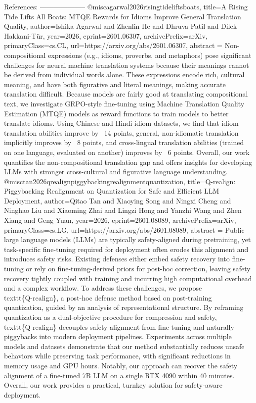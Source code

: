         References:
        --------------------
        @misc{agarwal2026risingtideliftsboats,
      title={A Rising Tide Lifts All Boats: MTQE Rewards for Idioms Improve General Translation Quality}, 
      author={Ishika Agarwal and Zhenlin He and Dhruva Patil and Dilek Hakkani-Tür},
      year={2026},
      eprint={2601.06307},
      archivePrefix={arXiv},
      primaryClass={cs.CL},
      url={https://arxiv.org/abs/2601.06307},
      abstract = {Non-compositional expressions (e.g., idioms, proverbs, and metaphors) pose significant challenges for neural machine translation systems because their meanings cannot be derived from individual words alone. These expressions encode rich, cultural meaning, and have both figurative and literal meanings, making accurate translation difficult. Because models are fairly good at translating compositional text, we investigate GRPO-style fine-tuning using Machine Translation Quality Estimation (MTQE) models as reward functions to train models to better translate idioms. Using Chinese and Hindi idiom datasets, we find that idiom translation abilities improve by ~14 points, general, non-idiomatic translation implicitly improves by ~8 points, and cross-lingual translation abilities (trained on one language, evaluated on another) improves by ~6 points. Overall, our work quantifies the non-compositional translation gap and offers insights for developing LLMs with stronger cross-cultural and figurative language understanding.}
}@misc{tan2026qrealignpiggybackingrealignmentquantization,
      title={Q-realign: Piggybacking Realignment on Quantization for Safe and Efficient LLM Deployment}, 
      author={Qitao Tan and Xiaoying Song and Ningxi Cheng and Ninghao Liu and Xiaoming Zhai and Lingzi Hong and Yanzhi Wang and Zhen Xiang and Geng Yuan},
      year={2026},
      eprint={2601.08089},
      archivePrefix={arXiv},
      primaryClass={cs.LG},
      url={https://arxiv.org/abs/2601.08089},
      abstract = {Public large language models (LLMs) are typically safety-aligned during pretraining, yet task-specific fine-tuning required for deployment often erodes this alignment and introduces safety risks. Existing defenses either embed safety recovery into fine-tuning or rely on fine-tuning-derived priors for post-hoc correction, leaving safety recovery tightly coupled with training and incurring high computational overhead and a complex workflow. To address these challenges, we propose \\texttt\{Q-realign\}, a post-hoc defense method based on post-training quantization, guided by an analysis of representational structure. By reframing quantization as a dual-objective procedure for compression and safety, \\texttt\{Q-realign\} decouples safety alignment from fine-tuning and naturally piggybacks into modern deployment pipelines. Experiments across multiple models and datasets demonstrate that our method substantially reduces unsafe behaviors while preserving task performance, with significant reductions in memory usage and GPU hours. Notably, our approach can recover the safety alignment of a fine-tuned 7B LLM on a single RTX 4090 within 40 minutes. Overall, our work provides a practical, turnkey solution for safety-aware deployment.}
}
